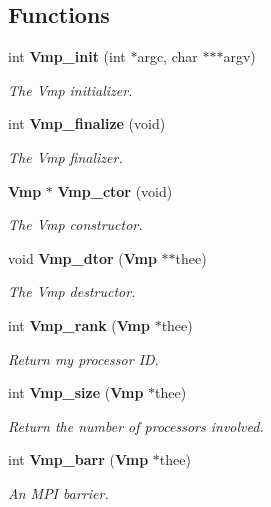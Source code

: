 \subsection*{Functions}
\begin{DoxyCompactItemize}
\item 
int {\bf Vmp\_\-init} (int $\ast$argc, char $\ast$$\ast$$\ast$argv)
\begin{DoxyCompactList}\small\item\em The Vmp initializer. \item\end{DoxyCompactList}\item 
int {\bf Vmp\_\-finalize} (void)
\begin{DoxyCompactList}\small\item\em The Vmp finalizer. \item\end{DoxyCompactList}\item 
{\bf Vmp} $\ast$ {\bf Vmp\_\-ctor} (void)
\begin{DoxyCompactList}\small\item\em The Vmp constructor. \item\end{DoxyCompactList}\item 
void {\bf Vmp\_\-dtor} ({\bf Vmp} $\ast$$\ast$thee)
\begin{DoxyCompactList}\small\item\em The Vmp destructor. \item\end{DoxyCompactList}\item 
int {\bf Vmp\_\-rank} ({\bf Vmp} $\ast$thee)
\begin{DoxyCompactList}\small\item\em Return my processor ID. \item\end{DoxyCompactList}\item 
int {\bf Vmp\_\-size} ({\bf Vmp} $\ast$thee)
\begin{DoxyCompactList}\small\item\em Return the number of processors involved. \item\end{DoxyCompactList}\item 
int {\bf Vmp\_\-barr} ({\bf Vmp} $\ast$thee)
\begin{DoxyCompactList}\small\item\em An MPI barrier. \item\end{DoxyCompactList}\item 
$$
\end{DoxyCompactItemize}
